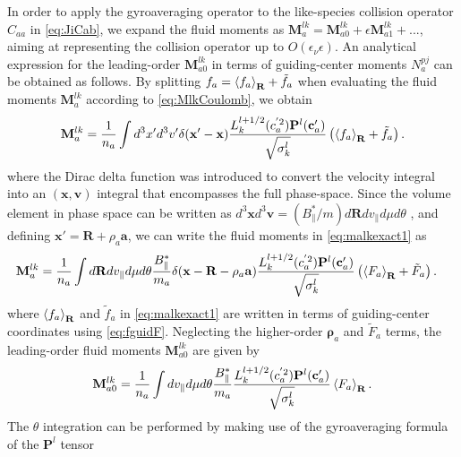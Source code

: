 {{In order to apply the gyroaveraging operator to the like-species collision operator $C_{aa}$ in \cref{eq:JiCab}, we expand the fluid moments as $\mathbf M_{a}^{lk}=\mathbf M_{a0}^{lk} + \epsilon \mathbf M_{a1}^{lk} + ...$, aiming at representing the collision operator up to $O(\epsilon_\nu \epsilon)$.
An analytical expression for the leading-order $\mathbf M_{a0}^{lk}$ in terms of guiding-center moments $N_{a}^{pj}$ can be obtained as follows.
By splitting $f_a = \left< f_a \right>_{\mathbf R} + \tilde f_a$ when evaluating the fluid moments $\mathbf M_a^{lk}$ according to \cref{eq:MlkCoulomb}, we obtain
%
\begin{equation}
    \mathbf M_a^{lk} = \frac{1}{n_a}\int d^3 x' d^3 v' \delta(\mathbf x' - \mathbf x)\frac{L_k^{l+1/2}(c_a^{'2}) \mathbf P^{l}(\mathbf c'_a)}{\sqrt{\sigma_k^l}}\left(\left< f_a \right>_{\mathbf R} + \tilde f_a\right).
    \label{eq:malkexact1}
\end{equation}
%
where the Dirac delta function was introduced to convert the velocity integral into an $(\mathbf x, \mathbf v)$ integral that encompasses the full phase-space.
Since the volume element in phase space can be written as $d^3 \mathbf x d^3\mathbf v = (B_\parallel^*/m)d \mathbf R dv_\parallel d \mu d\theta$ \citep{Cary2009}, and defining $\mathbf x' = \mathbf R + \rho_a \mathbf a$, we can write the fluid moments in \cref{eq:malkexact1} as
%
\begin{equation}
\begin{split}
    \mathbf M_a^{lk} &= \frac{1}{n_a}\int d \mathbf R  d v_\parallel d\mu d\theta\frac{B_\parallel^*}{m_a} \delta(\mathbf x-\mathbf R -  \rho_a \mathbf a)\frac{L_k^{l+1/2}(c_a^{'2}) \mathbf P^{l}(\mathbf c'_a)}{\sqrt{\sigma_k^l}}\left( \left< F_a \right>_{\mathbf R} + \tilde F_a\right).    
\end{split}
\label{eq:malkexact}
\end{equation}
%
where $\left< f_a \right>_{\mathbf R}$ and $\tilde f_a$ in \cref{eq:malkexact1} are written in terms of guiding-center coordinates using \cref{eq:fguidF}.
Neglecting the higher-order $\mathbf \rho_a$ and $\tilde F_a$ terms, the leading-order fluid moments $\mathbf M_{a0}^{lk}$ are given by
%
\begin{equation}
    \mathbf M_{a0}^{lk} = \frac{1}{n_a}\int d v_\parallel d\mu d\theta\frac{B_\parallel^*}{m_a} \frac{L_k^{l+1/2}(c_a^{'2}) \mathbf P^{l}(\mathbf c'_a)}{\sqrt{\sigma_k^l}}\left< F_a \right>_{\mathbf R} .
    \label{eq:malk0exact}
\end{equation}
%
The $\theta$ integration can be performed by making use of the gyroaveraging formula of the $\mathbf P^l$ tensor
}}
